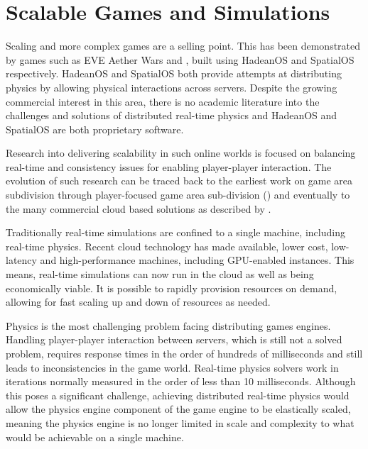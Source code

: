 \section{Scalable Games and Simulations}
Scaling and more complex games are a selling point. This has been demonstrated by games such as EVE Aether Wars \cite{AetherWars} and \cite{WorldsAd48:online}, built using HadeanOS and SpatialOS respectively. HadeanOS and SpatialOS both provide attempts at distributing physics by allowing physical interactions across servers. Despite the growing commercial interest in this area, there is no academic literature into the challenges and solutions of distributed real-time physics and HadeanOS and SpatialOS are both proprietary software.

Research into delivering scalability in such online worlds is focused on balancing real-time and consistency issues for enabling player-player interaction. The evolution of such research can be traced back to the earliest work on game area subdivision \cite{Npsnet} through player-focused game area sub-division (\cite{Morgan2005InterestManagement, Greenhalgh}) and eventually to the many commercial cloud based solutions as described by \cite{iCloudAccess}.

Traditionally real-time simulations are confined to a single machine, including real-time physics. 
Recent cloud technology has made available, lower cost, low-latency and high-performance machines, including GPU-enabled instances. This means, real-time simulations can now run in the cloud as well as being economically viable. It is possible to rapidly provision resources on demand, allowing for fast scaling up and down of resources as needed.

Physics is the most challenging problem facing distributing games engines. Handling player-player interaction between servers, which is still not a solved problem, requires response times in the order of hundreds of milliseconds and still leads to inconsistencies in the game world. Real-time physics solvers work in iterations normally measured in the order of less than 10 milliseconds. Although this poses a significant challenge, achieving distributed real-time physics would allow the physics engine component of the game engine to be elastically scaled, meaning the physics engine is no longer limited in scale and complexity to what would be achievable on a single machine.



